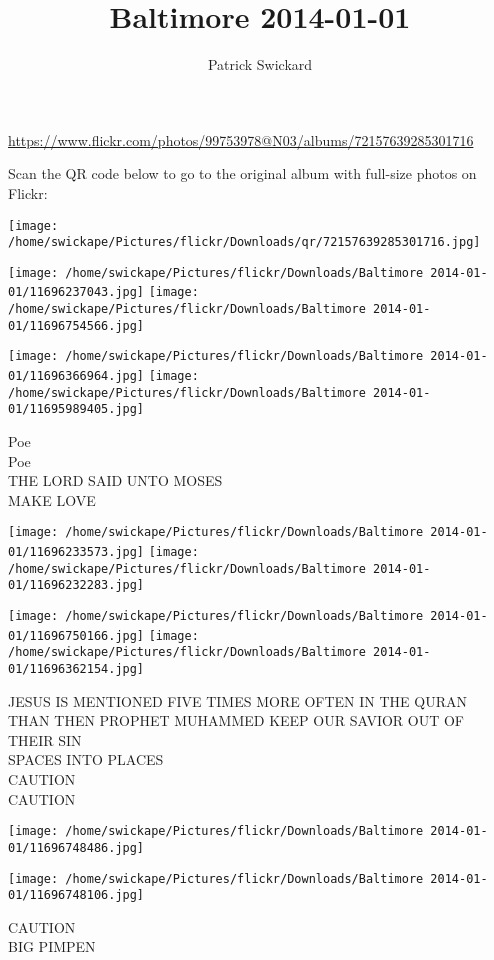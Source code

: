 \documentclass[10pt,letterpaper]{article}
\title{Baltimore 2014-01-01}
\author{Patrick Swickard}
\date{}
\begin{document}
\maketitle

\url{https://www.flickr.com/photos/99753978@N03/albums/72157639285301716}

Scan the QR code below to go to the original album with full-size photos on Flickr:

\texttt{[image: /home/swickape/Pictures/flickr/Downloads/qr/72157639285301716.jpg]}
\pagebreak

\texttt{[image: /home/swickape/Pictures/flickr/Downloads/Baltimore 2014-01-01/11696237043.jpg]}
\texttt{[image: /home/swickape/Pictures/flickr/Downloads/Baltimore 2014-01-01/11696754566.jpg]}

\texttt{[image: /home/swickape/Pictures/flickr/Downloads/Baltimore 2014-01-01/11696366964.jpg]}
\texttt{[image: /home/swickape/Pictures/flickr/Downloads/Baltimore 2014-01-01/11695989405.jpg]}

Poe\\
Poe\\
THE LORD SAID UNTO MOSES\\
MAKE LOVE
\pagebreak

\texttt{[image: /home/swickape/Pictures/flickr/Downloads/Baltimore 2014-01-01/11696233573.jpg]}
\texttt{[image: /home/swickape/Pictures/flickr/Downloads/Baltimore 2014-01-01/11696232283.jpg]}

\texttt{[image: /home/swickape/Pictures/flickr/Downloads/Baltimore 2014-01-01/11696750166.jpg]}
\texttt{[image: /home/swickape/Pictures/flickr/Downloads/Baltimore 2014-01-01/11696362154.jpg]}

JESUS IS MENTIONED FIVE TIMES MORE OFTEN IN THE QURAN THAN THEN PROPHET MUHAMMED KEEP OUR SAVIOR OUT OF THEIR SIN\\
SPACES INTO PLACES\\
CAUTION\\
CAUTION
\pagebreak

\texttt{[image: /home/swickape/Pictures/flickr/Downloads/Baltimore 2014-01-01/11696748486.jpg]}

\vspace{0.25in}
\texttt{[image: /home/swickape/Pictures/flickr/Downloads/Baltimore 2014-01-01/11696748106.jpg]}

CAUTION\\
BIG PIMPEN
\pagebreak
\end{document}

